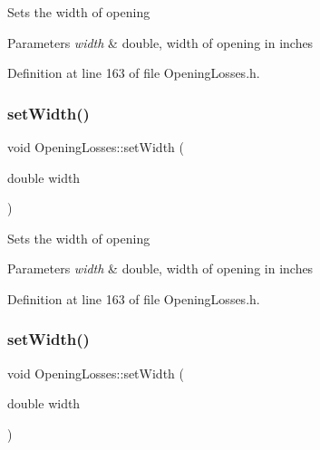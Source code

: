 Sets the width of opening 
\begin{DoxyParams}{Parameters}
{\em width} & double, width of opening in inches \\
\hline
\end{DoxyParams}


Definition at line 163 of file Opening\+Losses.\+h.

\mbox{\label{class_opening_losses_a5ee8c514917c16ecd2c63caecc98e1c6}} 
\subsubsection{\texorpdfstring{set\+Width()}{setWidth()}\hspace{0.1cm}{\footnotesize\ttfamily [2/3]}}
{\footnotesize\ttfamily void Opening\+Losses\+::set\+Width (\begin{DoxyParamCaption}\item[{double}]{width }\end{DoxyParamCaption})\hspace{0.3cm}{\ttfamily [inline]}}

Sets the width of opening 
\begin{DoxyParams}{Parameters}
{\em width} & double, width of opening in inches \\
\hline
\end{DoxyParams}


Definition at line 163 of file Opening\+Losses.\+h.

\mbox{\label{class_opening_losses_a5ee8c514917c16ecd2c63caecc98e1c6}} 
\subsubsection{\texorpdfstring{set\+Width()}{setWidth()}\hspace{0.1cm}{\footnotesize\ttfamily [3/3]}}
{\footnotesize\ttfamily void Opening\+Losses\+::set\+Width (\begin{DoxyParamCaption}\item[{double}]{width }\end{DoxyParamCaption})\hspace{0.3cm}{\ttfamily [inline]}}

